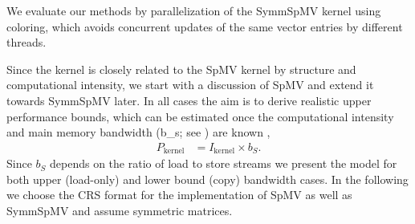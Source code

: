 We evaluate our methods by parallelization of the \acrfull{SymmSpMV}
kernel using \DTWO coloring, which avoids concurrent updates of the
same vector entries by different threads.


Since the kernel is closely related to the \acrfull{SpMV} kernel by
structure and computational intensity, we start with a discussion
of \acrshort{SpMV} and extend it towards \acrshort{SymmSpMV} later. In
all cases the aim is to derive realistic upper performance bounds,
which can be estimated once the computational intensity and main
memory bandwidth (\acrshort{b_s}; see ) are
known \cite{Williams_roofline}, \ie
\begin{align}
   	\label{eq:upper_performance}
   	P_\mathrm{kernel}  &= I_\mathrm{kernel}  \times b_S.
  \end{align}
Since $b_S$ depends on the ratio of load to store streams we present
the model for both upper (load-only) and lower bound (copy) bandwidth
cases.
In the following we choose the \acrfull{CRS} format for the
implementation of \acrshort{SpMV} as well as \acrshort{SymmSpMV} and
assume symmetric matrices.


